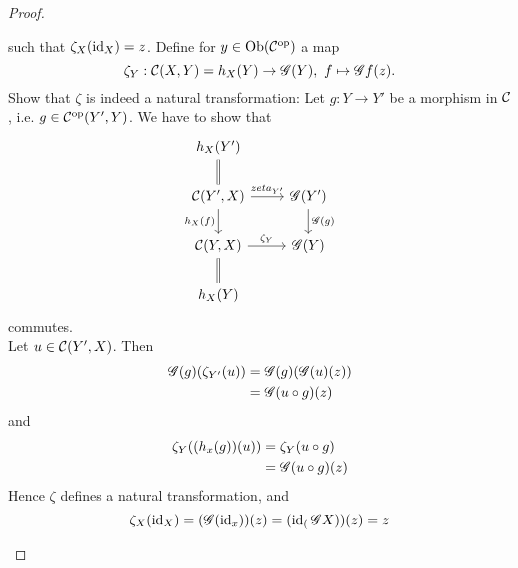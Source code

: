\begin{proof}
\begin{enumerate}
such that $\zeta_X(\operatorname{id}_X)=z$. Define for $y\in \text{Ob}(\mathcal{C}^{\mathrm{op}})$ a map
\[
\zeta_Y:\mathcal{C}(X,Y) = h_X(Y)\to \mathscr{G} (Y),~f\mapsto \mathscr{G} f(z).
\]
Show that $\zeta$ is indeed a natural transformation:
Let $g:Y\to Y'$ be a morphism in $\mathcal{C}$, i.e. $g\in \mathcal{C}^{\mathrm{op}}(Y',Y)$. We have to show that
\[
\begin{tikzcd}
h_X(Y')\ar[equal]{d}&\\
\ccat(Y',X)\ar{r}{zeta_{Y'}}\ar[swap]{d}{h_X(f)}&\gfunc(Y')\ar{d}{\gfunc(g)}\\
\ccat(Y,X)\ar{r}{\zeta_Y}&\gfunc(Y)\\
h_X(Y)\ar[equal]{u}&
\end{tikzcd}
\]
commutes. \\
Let $u\in \mathcal{C}(Y',X)$. Then
\begin{align*}
  \mathscr{G}(g)(\zeta_{Y'}(u))&= \mathscr{G}(g)(\mathscr{G}(u) (z))\\
                          &= \mathscr{G}(u\circ g)(z)
\end{align*}
and
\begin{align*}
  \zeta_Y((h_x(g))(u))&= \zeta_Y(u\circ g)\\
                    &= \mathscr{G}(u\circ g)(z)
\end{align*}
Hence $\zeta$ defines a natural transformation, and
\[
\zeta_X(\operatorname{id}_X) = (\mathscr{G}(\operatorname{id}_x))(z) = (\operatorname{id}_(\mathscr{G} X))(z) = z
\]

  \end{enumerate}
\end{proof}



\lec
